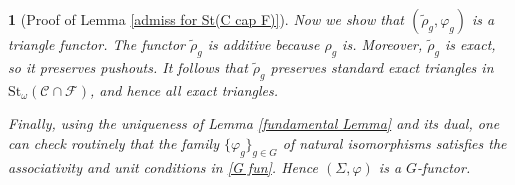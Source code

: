 \documentclass[12pt,twoside]{amsart}
\theoremstyle{bfupright head,slanted body}
\theoremstyle{bfupright head,upright body}
\newtheorem{bfhpg}[res]{}               \newtheorem*{bfhpg*}{}
\theoremstyle{fixed bf head,slanted body}
\theoremstyle{fixed bf head,upright body}
\theoremstyle{numbered paragraph}
\numberwithin{equation}{res}
\newcommand{\calC}{\mathcal{C}}
\newcommand{\calF}{\mathcal{F}}
\newcommand{\St}{\mathrm{St}}
\begin{document}
\begin{bfhpg}[Proof of Lemma \ref{admiss for St(C cap F)}]
Now we show that $(\widetilde{\rho}_g, \varphi_g)$ is a triangle functor.
The functor $\widetilde{\rho}_g$ is additive because $\rho_g$ is.
Moreover, $\widetilde{\rho}_g$ is exact, so it preserves pushouts.
It follows that $\widetilde{\rho}_g$ preserves standard exact triangles in $\St_\omega(\calC \cap \calF)$, and hence all exact triangles.

Finally, using the uniqueness of Lemma \ref{fundamental Lemma} and its dual, one can check routinely that the family $\{\varphi_g\}_{g \in G}$ of natural isomorphisms satisfies the associativity and unit conditions in \ref{G fun}.
Hence $(\mathsf{\Sigma}, \varphi)$ is a $G$-functor.
\qedhere
\end{bfhpg}




%
%
\end{document}
